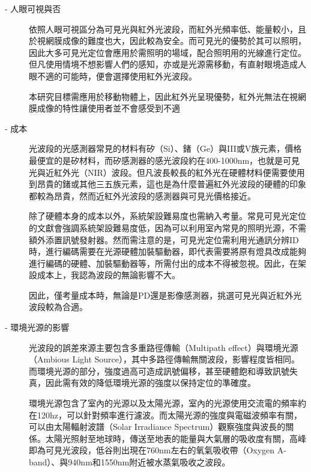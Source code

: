             \begin{description}

                \item[- 人眼可視與否]\hfill 
                
                \qquad
                依照人眼可視區分為可見光與紅外光波段，而紅外光頻率低、能量較小，且於視網膜成像的難度也大，因此較為安全。而可見光的優勢於其可以照明，因此大多可見光定位會應用於需照明的場域，配合照明用的光線進行定位。但凡使用情境不想影響人們的感知，亦或是光源需移動，有直射眼境造成人眼不適的可能時，便會選擇使用紅外光波段。

                \qquad 
                本研究目標需應用於移動物體上，因此紅外光呈現優勢，紅外光無法在視網膜成像的特性讓使用者並不會感受到不適

                \item[- 成本] \hfill 
                
                \qquad
                光波段的光感測器常見的材料有矽（Si）、鍺（Ge）與III或V族元素，價格最便宜的是矽材料，而矽感測器的感光波段約在400-1000nm，也就是可見光與近紅外光（NIR）波段。但凡波長較長的紅外光在硬體材料便需要使用到昂貴的鍺或其他三五族元素\cite{si_pd}，這也是為什麼普遍紅外光波段的硬體的印象都較為昂貴，然而近紅外光波段的感測器與可見光價格接近。

                \qquad
                除了硬體本身的成本以外，系統架設難易度也需納入考量。常見可見光定位的文獻會強調系統架設難易度低，因為可以利用室內常見的照明光源，不需額外添置訊號發射器\cite{vlc_adv}。然而需注意的是，可見光定位需利用光通訊分辨ID時，進行編碼需要在光源硬體加裝驅動器，即代表需要將原有燈具改成能夠進行編碼的硬體、加裝驅動器等，所需付出的成本不得被忽視。因此，在架設成本上，我認為波段的無論影響不大。
                
                \qquad
                因此，僅考量成本時，無論是PD還是影像感測器，挑選可見光與近紅外光波段較為合適。
        
                \item[- 環境光源的影響] \hfill 
                
                \qquad
                光波段的誤差來源主要包含多重路徑傳輸（Multipath effect）與環境光源（Ambious Light Source）\cite{survey_light2020}，其中多路徑傳輸無關波段，影響程度皆相同。而環境光源的部分，強度過高可造成訊號偏移，甚至硬體飽和導致訊號失真，因此需有效的降低環境光源的強度以保持定位的準確度。
            
                

                \qquad
                環境光源包含了室內的光源以及太陽光源，室內的光源使用交流電的頻率約在120hz，可以針對頻率進行濾波。而太陽光源的強度與電磁波頻率有關，可以由太陽輻射波譜（Solar Irradiance Spectrum）觀察強度與波長的關係。太陽光照射至地球時，傳送至地表的能量與大氣層的吸收度有關，高峰即為可見光波段，低谷則出現在760nm左右的氧氣吸收帶（Oxygen A-band）、與940nm和1550nm附近被水蒸氣吸收之波段\cite{book:solar_spectrum}。
                

\end{description}
